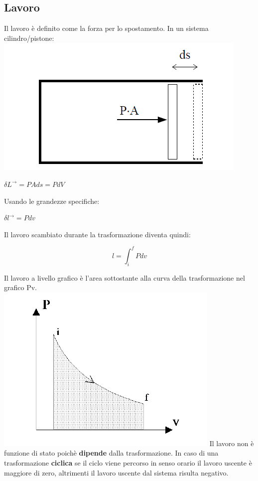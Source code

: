 \documentclass[a4paper,12pt,titlepage]{article}
\begin{document}
\subsection{Lavoro}
Il lavoro è definito come la forza per lo spostamento. In un sistema cilindro/pistone:\\
\includegraphics[scale=0.5]{work_piston}
\begin{center}
$ \delta L^{\rightarrow} = P  A ds = P dV $
\end{center}
Usando le grandezze specifiche: 
\begin{center}
$\delta l^{\rightarrow} = Pdv$
\end{center}
Il lavoro scambiato durante la trasformazione diventa quindi: 
\begin{center}
$$l = \int^{f}_{i}Pdv $$
\end{center}
Il lavoro a livello grafico è l'area sottostante alla curva della trasformazione nel grafico Pv.\\
\includegraphics[scale=0.5]{work_Pv}
\clearpage
Il lavoro non è funzione di stato poichè \textbf{dipende} dalla trasformazione. In caso di una trasformazione \textbf{ciclica} se il ciclo viene percorso in senso orario il lavoro uscente è maggiore di zero, altrimenti il lavoro uscente dal sistema risulta negativo.
\end{document}
